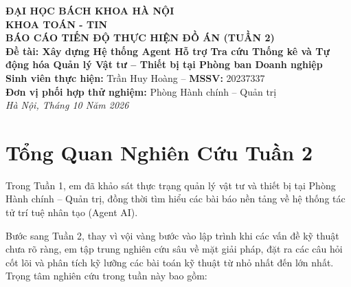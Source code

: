 \documentclass[11pt,a4paper]{article}
\begin{document}
\begin{center}
    {\large\bfseries ĐẠI HỌC BÁCH KHOA HÀ NỘI}\\[0.1cm]
    {\large\bfseries KHOA TOÁN - TIN}\\[0.5cm]
    
    {\Large\bfseries BÁO CÁO TIẾN ĐỘ THỰC HIỆN ĐỒ ÁN (TUẦN 2)}\\[0.3cm]
    {\large\bfseries Đề tài: Xây dựng Hệ thống Agent Hỗ trợ Tra cứu Thống kê và Tự động hóa Quản lý Vật tư -- Thiết bị tại Phòng ban Doanh nghiệp}\\[0.4cm]
    
    {\normalsize\textbf{Sinh viên thực hiện:} Trần Huy Hoàng \quad -- \quad \textbf{MSSV:} 20237337}\\[0.1cm]
    {\normalsize\textbf{Đơn vị phối hợp thử nghiệm:} Phòng Hành chính -- Quản trị}\\[0.1cm]
    {\normalsize\textit{Hà Nội, Tháng 10 Năm 2026}}
\end{center}

\vspace{0.2cm}
\vspace{0.5cm}

\section{Tổng Quan Nghiên Cứu Tuần 2}

Trong Tuần 1, em đã khảo sát thực trạng quản lý vật tư và thiết bị tại Phòng Hành chính -- Quản trị, đồng thời tìm hiểu các bài báo nền tảng về hệ thống tác tử trí tuệ nhân tạo (Agent AI).

Bước sang Tuần 2, thay vì vội vàng bước vào lập trình khi các vấn đề kỹ thuật chưa rõ ràng, em tập trung nghiên cứu sâu về mặt giải pháp, đặt ra các câu hỏi cốt lõi và phân tích kỹ lưỡng các bài toán kỹ thuật từ nhỏ nhất đến lớn nhất. Trọng tâm nghiên cứu trong tuần này bao gồm:
\end{document}
